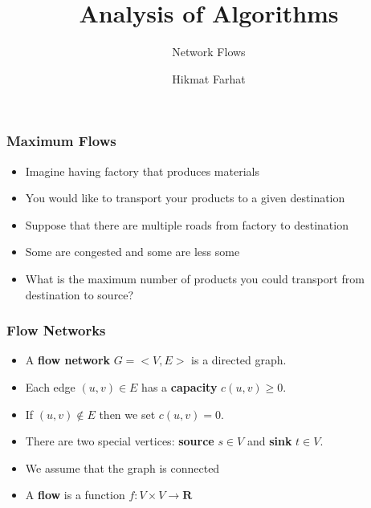 \documentclass{beamer}
\title{ Analysis of Algorithms}
\subtitle{Network Flows}
\author{Hikmat Farhat}
\begin{document}
\frame{\titlepage}

\begin{frame}
  \frametitle{Maximum Flows}
\begin{itemize}
  \item Imagine having factory that produces materials
  \item You would like to transport your products to a given destination
  \item Suppose that there are multiple roads from factory to destination
  \item Some are congested and some are less some
  \item What is the maximum number of products you could transport from destination to source?
\end{itemize}
  

\end{frame}  
\begin{frame}
  \frametitle{Flow Networks}
\begin{itemize}
  \item A \textbf{flow network} $G=<V,E>$ is a directed graph.
  \item Each edge $(u,v)\in E$ has a \textbf{capacity} $c(u,v)\ge 0$.
  \item If $(u,v)\notin E$ then we set $c(u,v)=0$.
  \item There are two special vertices: \textbf{source} $s\in V$ and \textbf{sink} $t\in V$.
  \item We assume that the graph is connected
  \item A \textbf{flow} is a function $f:V\times V\rightarrow \mathbf{R}$
\end{itemize}
  

\end{frame}
\end{document}
